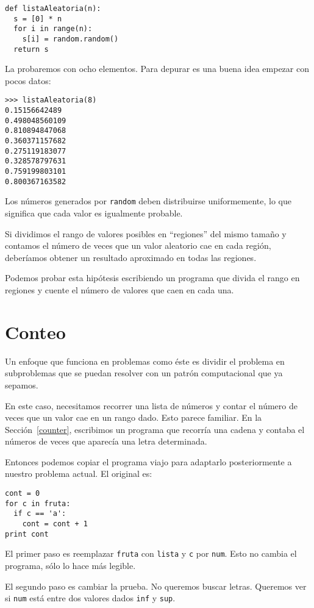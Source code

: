 \beforeverb
\begin{verbatim}
def listaAleatoria(n):
  s = [0] * n
  for i in range(n):
    s[i] = random.random()
  return s
\end{verbatim}
\afterverb
%
La probaremos con ocho elementos. Para depurar es una buena
idea empezar con pocos datos:

\beforeverb
\begin{verbatim}
>>> listaAleatoria(8)
0.15156642489
0.498048560109
0.810894847068
0.360371157682
0.275119183077
0.328578797631
0.759199803101
0.800367163582
\end{verbatim}
\afterverb
%
Los números generados por \texttt{random} deben distribuirse uniformemente,
lo que significa que cada valor es igualmente probable.

Si dividimos el rango de  valores posibles en ``regiones'' del mismo
tamaño y contamos el número de veces que un valor aleatorio cae
en cada región, deberíamos obtener un resultado aproximado en todas
las regiones.

Podemos probar esta hipótesis escribiendo un programa que
divida el rango en regiones y cuente el número de valores que caen
en cada una.


\section{Conteo}

Un enfoque que funciona en problemas como éste es dividir el problema
en subproblemas que se puedan resolver con un patrón computacional
que ya sepamos.

En este caso, necesitamos recorrer una lista de números y contar
el número de veces que un valor cae en un rango dado. Esto parece
familiar. En la Sección~\ref{counter}, escribimos un programa
que recorría una cadena y contaba el números de veces que aparecía
una letra determinada.

Entonces podemos copiar el programa viajo para adaptarlo posteriormente
a nuestro problema actual. El original es:

\beforeverb
\begin{verbatim}
cont = 0
for c in fruta:
  if c == 'a':
    cont = cont + 1
print cont
\end{verbatim}
\afterverb
%
El primer paso es reemplazar  \texttt{fruta} con \texttt{lista} y 
\texttt{c} por \texttt{num}.  Esto no cambia el programa, sólo lo hace
más legible.

El segundo paso es cambiar la prueba. No queremos buscar letras.
Queremos ver si  \texttt{num} está entre dos valores dados
\texttt{inf} y  \texttt{sup}.

